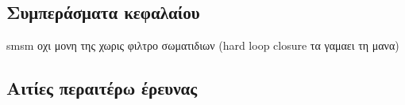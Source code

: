 \subsection{Συμπεράσματα κεφαλαίου}
smsm οχι μονη της χωρις φιλτρο σωματιδιων (hard loop closure τα γαμαει τη μανα)


\subsection{Αιτίες περαιτέρω έρευνας}

\begin{figure}[h]\centering
  \vspace{2cm}
  
  \vspace{1cm}
  \caption{}
  \label{}
\end{figure}
